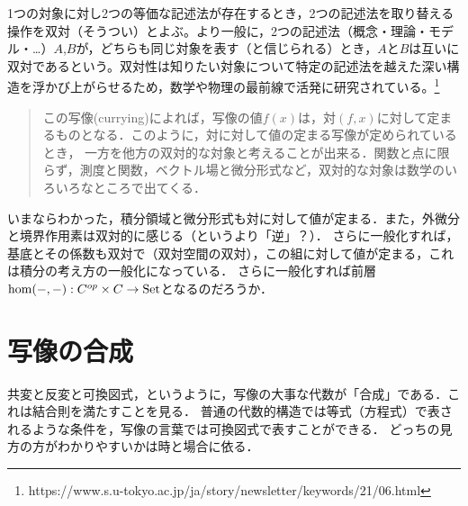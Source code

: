 \documentclass[uplatex,dvipdfmx]{jsreport}
\begin{document}
\begin{remark}[双対性]
    1つの対象に対し2つの等価な記述法が存在するとき，2つの記述法を取り替える操作を双対（そうつい）とよぶ。より一般に，2つの記述法（概念・理論・モデル・…）$A$,$B$が，どちらも同じ対象を表す（と信じられる）とき，$A$と$B$は互いに双対であるという。双対性は知りたい対象について特定の記述法を越えた深い構造を浮かび上がらせるため，数学や物理の最前線で活発に研究されている。\footnote{https://www.s.u-tokyo.ac.jp/ja/story/newsletter/keywords/21/06.html}
    \begin{quote}
        この写像(currying)によれば，写像の値$f(x)$は，対$(f,x)$に対して定まるものとなる．このように，対に対して値の定まる写像が定められているとき，
        一方を他方の双対的な対象と考えることが出来る．関数と点に限らず，測度と関数，ベクトル場と微分形式など，双対的な対象は数学のいろいろなところで出てくる．
    \end{quote}
    いまならわかった，積分領域と微分形式も対に対して値が定まる．また，外微分と境界作用素は双対的に感じる（というより「逆」？）．
    さらに一般化すれば，基底とその係数も双対で（双対空間の双対），この組に対して値が定まる，これは積分の考え方の一般化になっている．
    さらに一般化すれば前層$\hom(-,-):C^{op}\times C\to\mathrm{Set}$となるのだろうか．
\end{remark}

\section{写像の合成}

\begin{screen}
    共変と反変と可換図式，というように，写像の大事な代数が「合成」である．これは結合則を満たすことを見る．
    普通の代数的構造では等式（方程式）で表されるような条件を，写像の言葉では可換図式で表すことができる．
    どっちの見方の方がわかりやすいかは時と場合に依る．
\end{screen}
\end{document}
